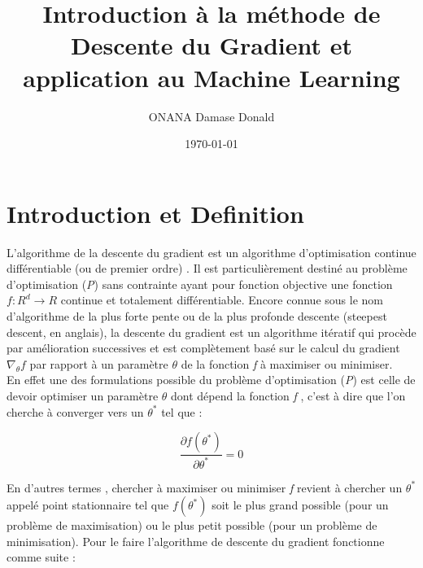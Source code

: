\documentclass[12pt,a4paper]{article}
\date{} %
\begin{document}
\author{ONANA Damase  Donald}
\title{Introduction à la méthode de Descente du Gradient et application au Machine Learning }
\date{\today}

\maketitle
\vspace{0.8in}
\section{Introduction et Definition} 

L'algorithme de la descente du gradient est un algorithme d'optimisation continue différentiable (ou de premier ordre) . Il est particulièrement destiné au problème d'optimisation (\textit{P}) sans contrainte  ayant pour fonction objective une fonction $f : R^{d} \rightarrow R$ continue et totalement différentiable. Encore connue sous le nom d'algorithme  de  la  plus  forte  pente ou de la plus  profonde  descente  (steepest  descent, en anglais), la descente du gradient est un algorithme itératif qui procède par amélioration successives et est complètement basé sur le calcul du gradient $\nabla_{\theta}{f}$ par rapport à un paramètre $\theta$ de la fonction \textit{f} à maximiser ou minimiser.\\
En effet une des formulations possible du problème d'optimisation (\textit{P}) est celle de devoir optimiser un paramètre $\theta$ dont dépend la fonction \textit{f} , c'est à dire que l'on cherche à converger vers un $\theta^{*}$ tel que : 
\vspace{0.2in}
\begin{large}
\begin{equation}
\frac{\partial{f(\theta^{*})}}{\partial{\theta^{*}}} = 0
\end{equation}
\end{large}
\vspace{0.2in}


En d'autres termes , chercher à maximiser ou minimiser \textit{f} revient à chercher un $\theta^{*}$ appelé point stationnaire tel que $f(\theta^{*})$ soit le plus grand possible (pour un problème de maximisation) ou le plus petit possible (pour un problème de minimisation). Pour le faire l'algorithme de descente du gradient fonctionne comme suite : \\
\end{document}
